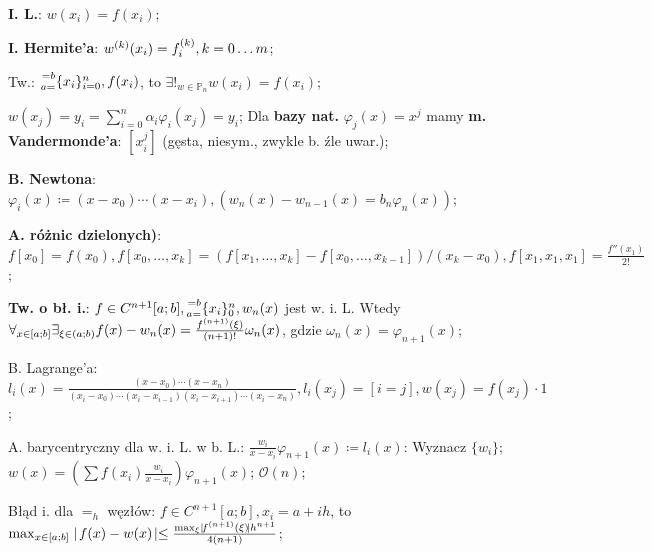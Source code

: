 
\entry
\textbf{I. L.}:
$w(x_i) = f(x_i)$;

\entry
\textbf{I. Hermite'a}:
$w^{(k)}(x_i) = f^{(k)}_i, k = 0 \ldots m$;

\entry
Tw.:
$\ipoints[i=0][n][a=][=b]{x_i}, f(x_i)$,
to
$\exists!_{w \in \mathbb{P}_n} w(x_i)=f(x_i)$;

\entry
$w(x_j) = y_i = \sum_{i=0}^n\alpha_i\varphi_i(x_j) = y_i$;
\entry
Dla \textbf{bazy nat.}
$\varphi_j(x)=x^j$
mamy \textbf{m. Vandermonde'a}:
$[x^j_i]$
(gęsta, niesym., zwykle b. źle uwar.);

\entry
\textbf{B. Newtona}:
$\varphi_i(x) \coloneqq (x-x_0)\cdots(x-x_i),
(w_n(x)-w_{n-1}(x) = b_n\varphi_n(x))$;

\entry
\textbf{A. różnic dzielonych)}:
$
f[x_0] = f(x_0),
f[x_0,\ldots,x_k] = (f[x_1,\ldots,x_k] - f[x_0,\ldots,x_{k-1}])/(x_k - x_0),
f[x_1, x_1, x_1] = \frac{f''(x_1)}{2!}
$;


\textbf{Tw. o bł. i.}:
$f\in C^{n+1}[a;b], \ipoints[0][n][a=][=b]{x_i}, w_n(x)$ jest w. i. L.
Wtedy
$\forall_{x \in [a;b]} \exists_{\xi \in (a;b)} f(x) - w_n(x) = \frac{f^{(n+1)}(\xi)}{(n+1)!}\omega_n(x)$,
gdzie $\omega_n(x)=\varphi_{n+1}(x)$;


\entry
B. Lagrange'a:
$
l_i(x) = \frac{(x-x_0)\cdots(x-x_n)}{(x_i - x_0)\cdots(x_i - x_{i-1})(x_i - x_{i+1}) \cdots (x_i - x_n)},
l_i(x_j) = [i=j],
w(x_j)=f(x_j)\cdot 1
$;

\entry
A. barycentryczny dla w. i. L. w b. L.:
$\frac{w_i}{x - x_i}\varphi_{n+1}(x) \coloneqq l_i(x)$:
Wyznacz
$\{w_i\}$;
$w(x) = (\sum f(x_i)\frac{w_i}{x - x_i})\varphi_{n+1}(x)$;
$\mathcal{O}(n)$;

\entry
Błąd i. dla $=_h$ węzłów:
$f \in C^{n+1}[a;b], x_i=a+ih$, to
$\max_{x \in [a;b]}\mid\! f(x)-w(x)\! \mid \leq \frac{\max_\xi\mid\! f^{(n+1)}(\xi)\! \mid h^{n+1}}{4(n+1)}$;
